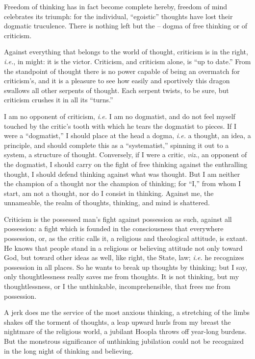 \documentclass[12pt,a4paper]{book}
\begin{document}
Freedom of thinking has in fact become complete hereby, freedom of mind 
celebrates its triumph: for the individual, ``egoistic'' thoughts have lost 
their dogmatic truculence. There is nothing left but the -- dogma of free 
thinking or of criticism.

Against everything that belongs to the world of thought, criticism is in the 
right, \textit{i.e.}, in might: it is the victor. Criticism, and criticism 
alone, is ``up to date.'' From the standpoint of thought there is no power 
capable of being an overmatch for criticism's, and it is a pleasure to see how 
easily and sportively this dragon swallows all other serpents of thought. Each 
serpent twists, to be sure, but criticism crushes it in all its ``turns.''

I am no opponent of criticism, \textit{i.e.} I am no dogmatist, and do not 
feel myself touched by the critic's tooth with which he tears the dogmatist to 
pieces. If I were a ``dogmatist,'' I should place at the head a dogma, 
\textit{i.e.} a thought, an idea, a principle, and should complete this as a 
``systematist,'' spinning it out to a system, a structure of thought. 
Conversely, if I were a critic, \textit{viz}., an opponent of the dogmatist, I 
should carry on the fight of free thinking against the enthralling thought, I 
should defend thinking against what was thought. But I am neither the champion 
of a thought nor the champion of thinking; for ``I,'' from whom I start, am 
not a thought, nor do I consist in thinking. Against me, the unnameable, the 
realm of thoughts, thinking, and mind is shattered.

Criticism is the possessed man's fight against possession as such, against all 
possession: a fight which is founded in the consciousness that everywhere 
possession, or, as the critic calls it, a religious and theological attitude, 
is extant. He knows that people stand in a religious or believing attitude not 
only toward God, but toward other ideas as well, like right, the State, law; 
\textit{i.e.} he recognizes possession in all places. So he wants to break up 
thoughts by thinking; but I say, only thoughtlessness really saves me from 
thoughts. It is not thinking, but my thoughtlessness, or I the unthinkable, 
incomprehensible, that frees me from possession.

A jerk does me the service of the most anxious thinking, a stretching of the 
limbs shakes off the torment of thoughts, a leap upward hurls from my breast 
the nightmare of the religious world, a jubilant Hoopla throws off year-long 
burdens. But the monstrous significance of unthinking jubilation could not be 
recognized in the long night of thinking and believing.
\end{document}
